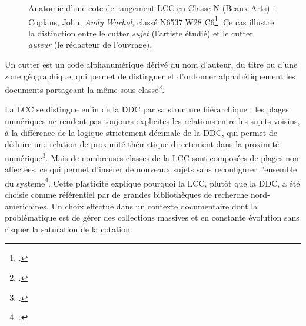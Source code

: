 \begin{figure}[h]
\centering
{}
\caption{Anatomie d'une cote de rangement LCC en Classe N (Beaux-Arts) : Coplans, John, \textit{Andy Warhol}, classé N6537.W28 C6\footcite[p.~210-211]{chan1990}. Ce cas illustre la distinction entre le cutter \emph{sujet} (l'artiste étudié) et le cutter \emph{auteur} (le rédacteur de l'ouvrage).}
\label{fig:anatomie-cote-lcc}
\end{figure}

Un cutter est un code alphanumérique dérivé du nom d'auteur, du titre ou d'une zone géographique, qui permet de distinguer et d'ordonner alphabétiquement les documents partageant la même sous-classe\footcite[p.~80-88]{chan1990}.

La LCC se distingue enfin de la DDC par sa structure hiérarchique : les plages numériques ne rendent pas toujours explicites les relations entre les sujets voisins, à la différence de la logique strictement décimale de la DDC, qui permet de déduire une relation de proximité thématique directement dans la proximité numérique\footcite{tacq2006}. Mais de nombreuses classes de la LCC sont composées de plages non affectées, ce qui permet d'insérer de nouveaux sujets sans reconfigurer l'ensemble du système\footcite[p.~82]{chan1990}. Cette plasticité explique pourquoi la LCC, plutôt que la DDC, a été choisie comme référentiel par de grandes bibliothèques de recherche nord-américaines. Un choix effectué dans un contexte documentaire dont la problématique est de gérer des collections massives et en constante évolution sans risquer la saturation de la cotation.


